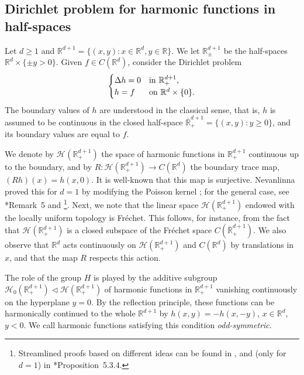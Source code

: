\documentclass[12pt]{paper}
\numberwithin{equation}{section}
\theoremstyle{plain}
\theoremstyle{definition}
\newcommand{\R}{\mathbb{R}}
\newcommand{\Rd}{\mathbb{R}^{d}}
\newcommand{\harm}[2][]{\mathcal{H}_{#1}(#2)}
\begin{document}
\subsection{Dirichlet problem for harmonic functions in half-spaces}
\label{sec:Dirichlet}

Let \(d\ge 1\) and \(\R^{d+1} = \{(x, y)\colon x\in\Rd, y\in\R\}\). We let
\(\R^{d+1}_\pm\) be the half-spaces \(\Rd \times \{\pm y>0\}\).
Given \(f\in C(\Rd)\), consider the Dirichlet problem
\[
\begin{cases}
\Delta h = 0 & {\rm in\ } \R^{d+1}_+, \\
h = f & {\rm on\ } \Rd\times\{0\}.
\end{cases}
\]
The boundary values of \(h\) are understood in the classical sense, that is, \(h\) is assumed to be continuous
in the closed half-space \(\overline{\R}^{d+1}_+ = \{(x, y)\colon y\ge 0\}\), and its boundary values are equal to \(f\).


We denote by \( \harm{\R^{d+1}_+}\) the space of harmonic functions in \( \R^{d+1}_+\) continuous up
to the boundary, and by \( R\colon \mathcal H(\R^{d+1}_+) \to C(\Rd)\) the boundary trace map,
\( (Rh)(x)=h(x, 0)\).  It is well-known that this map is surjective.  Nevanlinna proved this for
\(d=1\) by modifying the Poisson kernel \cite{Nevanlinna1925}; for the general case, see
\cite{FinkelsteinScheinberg}*{Remark~5} and \cite{Gardiner81}\footnote{Streamlined proofs based on
  different ideas can be found in \cite{Arakelyan}, and (only for \(d=1\)) in
  \cite{BHM}*{Proposition~5.3.4}.}.  Next, we note that the linear space
\( \mathcal H(\R^{d+1}_+) \) endowed with the locally uniform topology is Fr\'echet. This follows,
for instance, from the fact that \( \mathcal H(\R^{d+1}_+) \) is a closed subspace of the Fr\'echet
space \( C(\overline{\R}_{+}^{d+1}) \).  We also observe that \( \Rd \) acts continuously on
\( \mathcal H(\R^{d+1}_+) \) and \( C(\Rd) \) by translations in \( x \), and that the map \( R \)
respects this action.

The role of the group \( H \) is played by the additive subgroup
\( \mathcal H_0(\R^{d+1}_+) \triangleleft \mathcal H(\R^{d+1}_+) \) of harmonic functions in
\( \R^{d+1}_+ \) vanishing continuously on the hyperplane \( y=0 \). By the reflection
principle, these functions can be harmonically continued to the whole \( \R^{d+1} \) by
\( h(x, y) = - h(x, -y) \), \( x\in\Rd \), \( y<0\). We call harmonic functions satisfying this
condition \emph{odd-symmetric}.
\end{document}
